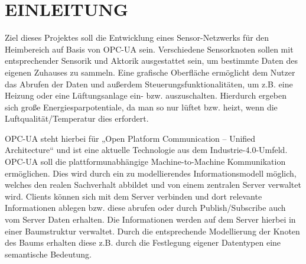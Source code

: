 \section{EINLEITUNG}\label{ch:einleitung}

Ziel dieses Projektes soll die Entwicklung eines Sensor-Netzwerks für den Heimbereich auf Basis von OPC-UA sein. 
Verschiedene Sensorknoten sollen mit entsprechender Sensorik und Aktorik ausgestattet sein, um bestimmte Daten des eigenen Zuhauses zu sammeln. 
Eine grafische Oberfläche ermöglicht dem Nutzer das Abrufen der Daten und außerdem Steuerungsfunktionalitäten, um z.B. eine Heizung oder eine Lüftungsanlage ein- bzw. auszuschalten. 
Hierdurch ergeben sich große Energiesparpotentiale, da man so nur lüftet bzw. heizt, wenn die Luftqualität/Temperatur dies erfordert.  

OPC-UA steht hierbei für „Open Platform Communication – Unified Architecture“ und ist eine aktuelle Technologie aus dem Industrie-4.0-Umfeld. OPC-UA soll die plattformunabhängige Machine-to-Machine Kommunikation ermöglichen. 
Dies wird durch ein zu modellierendes Informationsmodell möglich, welches den realen Sachverhalt abbildet und von einem zentralen Server verwaltet wird. 
Clients können sich mit dem Server verbinden und dort relevante Informationen ablegen bzw. diese abrufen oder durch Publish/Subscribe auch vom Server Daten erhalten. Die Informationen werden auf dem Server hierbei in einer Baumstruktur verwaltet. 
Durch die entsprechende Modellierung der Knoten des Baums erhalten diese z.B. durch die Festlegung eigener Datentypen eine semantische Bedeutung.
